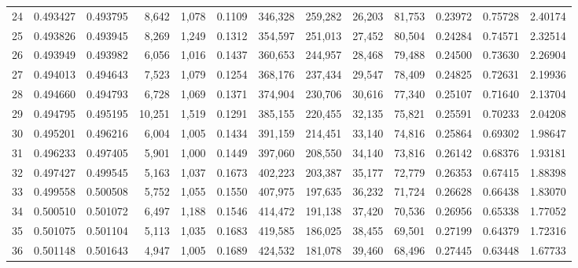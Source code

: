 \begin{tabular}{rrrrrrrrrrrrr}
24 &  0.493427 &  0.493795 &   8,642 &  1,078 &                                     0.1109 &  346,328 &  259,282 &   26,203 &   81,753 &  0.23972 &  0.75728 &  2.40174 \\
25 &  0.493826 &  0.493945 &   8,269 &  1,249 &                                     0.1312 &  354,597 &  251,013 &   27,452 &   80,504 &  0.24284 &  0.74571 &  2.32514 \\
26 &  0.493949 &  0.493982 &   6,056 &  1,016 &                                     0.1437 &  360,653 &  244,957 &   28,468 &   79,488 &  0.24500 &  0.73630 &  2.26904 \\
27 &  0.494013 &  0.494643 &   7,523 &  1,079 &                                     0.1254 &  368,176 &  237,434 &   29,547 &   78,409 &  0.24825 &  0.72631 &  2.19936 \\
28 &  0.494660 &  0.494793 &   6,728 &  1,069 &                                     0.1371 &  374,904 &  230,706 &   30,616 &   77,340 &  0.25107 &  0.71640 &  2.13704 \\
29 &  0.494795 &  0.495195 &  10,251 &  1,519 &                                     0.1291 &  385,155 &  220,455 &   32,135 &   75,821 &  0.25591 &  0.70233 &  2.04208 \\
30 &  0.495201 &  0.496216 &   6,004 &  1,005 &                                     0.1434 &  391,159 &  214,451 &   33,140 &   74,816 &  0.25864 &  0.69302 &  1.98647 \\
31 &  0.496233 &  0.497405 &   5,901 &  1,000 &                                     0.1449 &  397,060 &  208,550 &   34,140 &   73,816 &  0.26142 &  0.68376 &  1.93181 \\
32 &  0.497427 &  0.499545 &   5,163 &  1,037 &                                     0.1673 &  402,223 &  203,387 &   35,177 &   72,779 &  0.26353 &  0.67415 &  1.88398 \\
33 &  0.499558 &  0.500508 &   5,752 &  1,055 &                                     0.1550 &  407,975 &  197,635 &   36,232 &   71,724 &  0.26628 &  0.66438 &  1.83070 \\
34 &  0.500510 &  0.501072 &   6,497 &  1,188 &                                     0.1546 &  414,472 &  191,138 &   37,420 &   70,536 &  0.26956 &  0.65338 &  1.77052 \\
35 &  0.501075 &  0.501104 &   5,113 &  1,035 &                                     0.1683 &  419,585 &  186,025 &   38,455 &   69,501 &  0.27199 &  0.64379 &  1.72316 \\
36 &  0.501148 &  0.501643 &   4,947 &  1,005 &                                     0.1689 &  424,532 &  181,078 &   39,460 &   68,496 &  0.27445 &  0.63448 &  1.67733 \\

\end{tabular}
